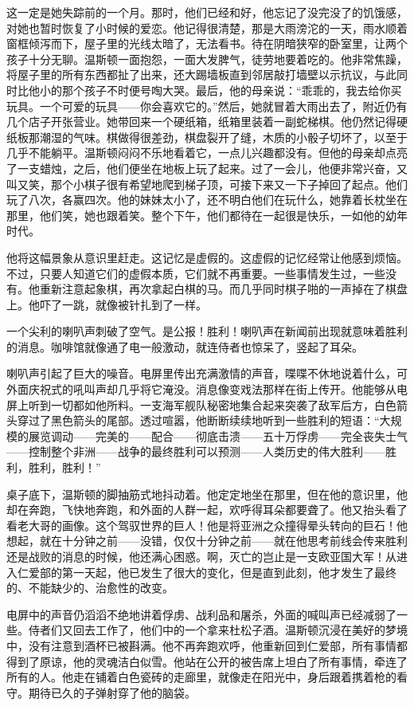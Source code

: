 这一定是她失踪前的一个月。那时，他们已经和好，他忘记了没完没了的饥饿感，对她也暂时恢复了小时候的爱恋。他记得很清楚，那是大雨滂沱的一天，雨水顺着窗框倾泻而下，屋子里的光线太暗了，无法看书。待在阴暗狭窄的卧室里，让两个孩子十分无聊。温斯顿一面抱怨，一面大发脾气，徒劳地要着吃的。他非常焦躁，将屋子里的所有东西都扯了出来，还大踢墙板直到邻居敲打墙壁以示抗议，与此同时比他小的那个孩子不时便号啕大哭。最后，他的母亲说：``乖乖的，我去给你买玩具。一个可爱的玩具——你会喜欢它的。''然后，她就冒着大雨出去了，附近仍有几个店子开张营业。她带回来一个硬纸箱，纸箱里装着一副蛇梯棋。他仍然记得硬纸板那潮湿的气味。棋做得很差劲，棋盘裂开了缝，木质的小骰子切坏了，以至于几乎不能躺平。温斯顿闷闷不乐地看着它，一点儿兴趣都没有。但他的母亲却点亮了一支蜡烛，之后，他们便坐在地板上玩了起来。过了一会儿，他便非常兴奋，又叫又笑，那个小棋子很有希望地爬到梯子顶，可接下来又一下子掉回了起点。他们玩了八次，各赢四次。他的妹妹太小了，还不明白他们在玩什么，她靠着长枕坐在那里，他们笑，她也跟着笑。整个下午，他们都待在一起很是快乐，一如他的幼年时代。

他将这幅景象从意识里赶走。这记忆是虚假的。这虚假的记忆经常让他感到烦恼。不过，只要人知道它们的虚假本质，它们就不再重要。一些事情发生过，一些没有。他重新注意起象棋，再次拿起白棋的马。而几乎同时棋子啪的一声掉在了棋盘上。他吓了一跳，就像被针扎到了一样。

一个尖利的喇叭声刺破了空气。是公报！胜利！喇叭声在新闻前出现就意味着胜利的消息。咖啡馆就像通了电一般激动，就连侍者也惊呆了，竖起了耳朵。

喇叭声引起了巨大的噪音。电屏里传出充满激情的声音，喋喋不休地说着什么，可外面庆祝式的吼叫声却几乎将它淹没。消息像变戏法那样在街上传开。他能够从电屏上听到一切都如他所料。一支海军舰队秘密地集合起来突袭了敌军后方，白色箭头穿过了黑色箭头的尾部。透过喧嚣，他断断续续地听到一些胜利的短语：``大规模的展览调动——完美的——配合——彻底击溃——五十万俘虏——完全丧失士气——控制整个非洲——战争的最终胜利可以预测——人类历史的伟大胜利——胜利，胜利，胜利！''

桌子底下，温斯顿的脚抽筋式地抖动着。他定定地坐在那里，但在他的意识里，他却在奔跑，飞快地奔跑，和外面的人群一起，欢呼得耳朵都要聋了。他又抬头看了看老大哥的画像。这个驾驭世界的巨人！他是将亚洲之众撞得晕头转向的巨石！他想起，就在十分钟之前——没错，仅仅十分钟之前——就在他思考前线会传来胜利还是战败的消息的时候，他还满心困惑。啊，灭亡的岂止是一支欧亚国大军！从进入仁爱部的第一天起，他已发生了很大的变化，但是直到此刻，他才发生了最终的、不能缺少的、治愈性的改变。

电屏中的声音仍滔滔不绝地讲着俘虏、战利品和屠杀，外面的喊叫声已经减弱了一些。侍者们又回去工作了，他们中的一个拿来杜松子酒。温斯顿沉浸在美好的梦境中，没有注意到酒杯已被斟满。他不再奔跑欢呼，他重新回到仁爱部，所有事情都得到了原谅，他的灵魂洁白似雪。他站在公开的被告席上坦白了所有事情，牵连了所有的人。他走在铺着白色瓷砖的走廊里，就像走在阳光中，身后跟着携着枪的看守。期待已久的子弹射穿了他的脑袋。

